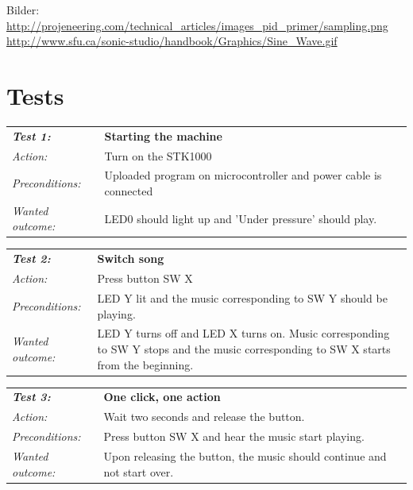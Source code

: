 \documentclass[a4paper,12pt]{article}
\begin{document}
Bilder:
\url{http://projeneering.com/technical_articles/images_pid_primer/sampling.png}
\url{http://www.sfu.ca/sonic-studio/handbook/Graphics/Sine_Wave.gif}



\clearpage
\appendix
{}
\section{Tests}

\begin{tabular}[h]{|lp{12cm}|} \hline
\textbf{\emph{Test 1:}} 		& \textbf{Starting the machine}\\
\emph{Action:} 		& Turn on the STK1000\\
\emph{Preconditions:}	& Uploaded program on microcontroller and power cable is connected\\
\emph{Wanted outcome:}	& LED0 should light up and 'Under pressure' should play. \\ \hline
\end{tabular}
\vspace{1cm}

\begin{tabular}[h]{|lp{12cm}|} \hline
\textbf{\emph{Test 2:}} 		& \textbf{Switch song}\\
\emph{Action:} 		& Press button SW X\\
\emph{Preconditions:}	& LED Y lit and the music corresponding to SW Y should be playing.\\
\emph{Wanted outcome:}	& LED Y turns off and LED X turns on. Music corresponding to SW Y stops and the music corresponding to SW X starts from the beginning.\\ \hline
\end{tabular}
\vspace{1cm}

\begin{tabular}[h]{|lp{12cm}|} \hline
\textbf{\emph{Test 3:}} 		& \textbf{One click, one action}\\
\emph{Action:} 		& Wait two seconds and release the button.\\
\emph{Preconditions:}	& Press button SW X and hear the music start playing.\\
\emph{Wanted outcome:}	& Upon releasing the button, the music should continue and not start over. \\ \hline
\end{tabular}
\vspace{1cm}
\end{document}
